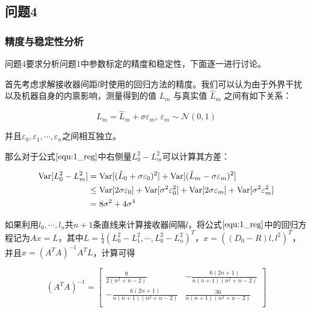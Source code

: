 \subsection{问题4}

\subsubsection{精度与稳定性分析}
问题4要求分析问题1中参数标定的精度和稳定性，下面逐一进行讨论。

首先考虑求解接收器间距$l$时使用的回归方法的精度。我们可以认为由于外界干扰以及机器自身的内禀影响，测量得到的值 $L_m$ 与真实值 $\hat L_m$ 之间有如下关系：

\begin{equation}
	L_m = \hat L_m + \sigma\varepsilon_m\text{, } \varepsilon_m \sim \mathcal N(0, 1)
	\label{equ:4_relation}
\end{equation}

并且$\varepsilon_0, \varepsilon_1, \cdots, \varepsilon_n$之间相互独立。

那么对于公式$\ref{equ:1_reg}$中右侧量$L_0^2-L_m^2$可以计算其方差：

\begin{equation}
	\begin{aligned}
		\mathrm{Var}[L_0^2-L_m^2] &= \mathrm{Var}[(\hat L_0 + \sigma\varepsilon_0)^2] + \mathrm{Var}[(\hat L_m - \sigma\varepsilon_m)^2] \\
		&\leq \mathrm{Var}[2\sigma\varepsilon_0] + \mathrm{Var}[\sigma^2\varepsilon_0^2] + \mathrm{Var}[2\sigma\varepsilon_m] + \mathrm{Var}[\sigma^2\varepsilon_m^2] \\
		&= 8\sigma^2 + 4\sigma^4
	\end{aligned}
	\label{equ:4_reg_var}
\end{equation}

如果利用$l_0, \cdots, l_n$共$n + 1$条直线来计算接收器间隔$l$，将公式$\ref{equ:1_reg}$中的回归方程记为$Ax=L$，其中$L=\frac{1}{4}(L_0^2-L_1^2, \cdots, L_0^2 - L_n^2)^T$，$x = ((D_0-R)l, l^2)^T$，并且$x = (A^TA)^{-1}A^TL$，计算可得

\begin{equation}
	(A^TA)^{-1} =
	\begin{bmatrix}
		\frac{9}{2 \left(n^2+n-2\right)} & -\frac{6 (2 n+1)}{n (n+1) \left(n^2+n-2\right)} \\
		-\frac{6 (2 n+1)}{n (n+1) \left(n^2+n-2\right)} & \frac{36}{n (n+1) \left(n^2+n-2\right)} \\
	\end{bmatrix}
	\label{equ:4_ATA_reg}
\end{equation}

